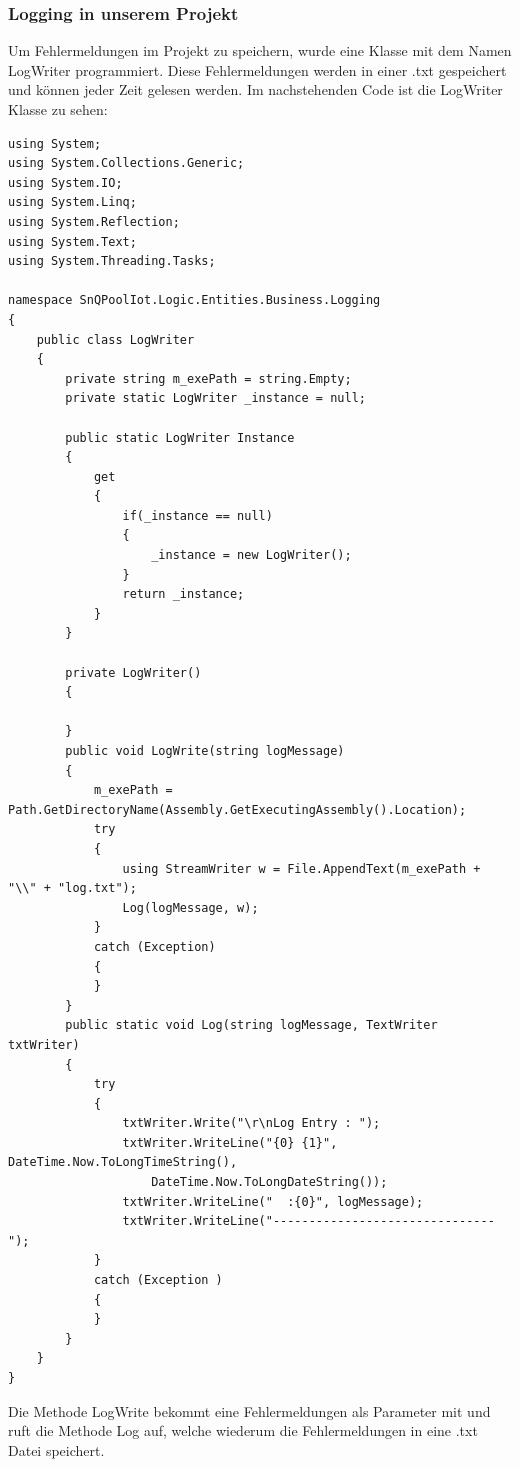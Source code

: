 \subsubsection{Logging in unserem Projekt}
Um Fehlermeldungen im Projekt zu speichern, wurde eine Klasse mit dem Namen LogWriter programmiert.
Diese Fehlermeldungen werden in einer .txt gespeichert und können jeder Zeit gelesen werden.
Im nachstehenden Code ist die LogWriter Klasse zu sehen:
\\
\begin{lstlisting}
using System;
using System.Collections.Generic;
using System.IO;
using System.Linq;
using System.Reflection;
using System.Text;
using System.Threading.Tasks;

namespace SnQPoolIot.Logic.Entities.Business.Logging
{
    public class LogWriter
    {
        private string m_exePath = string.Empty;
        private static LogWriter _instance = null;

        public static LogWriter Instance
        {
            get
            {
                if(_instance == null)
                {
                    _instance = new LogWriter();
                }
                return _instance;
            }
        }

        private LogWriter()
        {

        }
        public void LogWrite(string logMessage)
        {
            m_exePath = Path.GetDirectoryName(Assembly.GetExecutingAssembly().Location);
            try
            {
                using StreamWriter w = File.AppendText(m_exePath + "\\" + "log.txt");
                Log(logMessage, w);
            }
            catch (Exception)
            {
            }
        }
        public static void Log(string logMessage, TextWriter txtWriter)
        {
            try
            {
                txtWriter.Write("\r\nLog Entry : ");
                txtWriter.WriteLine("{0} {1}", DateTime.Now.ToLongTimeString(),
                    DateTime.Now.ToLongDateString());
                txtWriter.WriteLine("  :{0}", logMessage);
                txtWriter.WriteLine("-------------------------------");
            }
            catch (Exception )
            {
            }
        }
    }
}
\end{lstlisting}

Die Methode LogWrite bekommt eine Fehlermeldungen als Parameter mit 
und ruft die Methode Log auf, welche wiederum die Fehlermeldungen in eine .txt Datei speichert.

